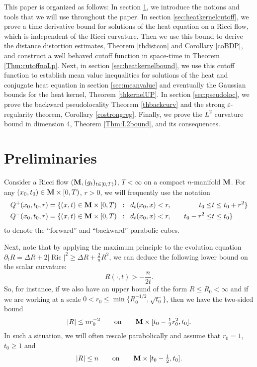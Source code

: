\documentclass[11pt]{amsart}
\numberwithin{equation}{section}
\def\M{{\bf M}}
\DeclareMathOperator{\Ric}{Ric}
\numberwithin{equation}{section}
\begin{document}
This paper is organized as follows:
In section \ref{sec:Preliminaries}, we introduce the notions and tools that we will use throughout the paper.
In section \ref{sec:heatkernelcutoff}, we prove a time derivative bound for solutions of the heat equation on a Ricci flow, which is independent of the Ricci curvature.
Then we use this bound to derive the distance distortion estimates, Theorem \ref{thdistcon} and Corollary \ref{coBDP}, and construct a well behaved cutoff function in space-time in Theorem \ref{Thm:cutoffnoLp}.
Next, in section \ref{sec:heatkernelbound}, we use this cutoff function to establish mean value inequalities for solutions of the heat and conjugate heat equation in section \ref{sec:meanvalue} and eventually the Gaussian bounds for the heat kernel, Theorem \ref{thkernelUP}.
In section \ref{sec:pseudoloc}, we prove the backward pseudolocality Theorem \ref{thbackcurv} and the strong $\varepsilon$-regularity theorem, Corollary \ref{costrongreg}.
Finally, we prove the $L^2$ curvature bound in dimension 4, Theorem \ref{Thm:L2bound}, and its consequences.

\section{Preliminaries} \label{sec:Preliminaries}
Consider a Ricci flow $(\M, (g_t)_{t \in [0,T)})$, $T < \infty$ on a compact $n$-manifold $\M$.
For any $(x_0, t_0) \in \M \times [0,T)$, $r > 0$, we will frequently use the notation
\begin{alignat*}{3}
 Q^+(x_0, t_0, r) &= \{ (x, t) \in \M \times [0,T) \;\; : \;\; d_t (x_0, x)<r, \quad & t_0 \leq & t \leq t_0+r^2 \} \\
 Q^-(x_0, t_0, r) &= \{ (x, t) \in \M \times [0,T) \;\; : \;\; d_t (x_0, x)<r, \quad & t_0 - r^2 \leq & t \leq t_0 \} 
\end{alignat*}
to denote the ``forward'' and ``backward'' parabolic cubes.

Next, note that by applying the maximum principle to the evolution equation $\partial_t R = \Delta R + 2 |{\Ric}|^2 \geq \Delta R + \frac2{n} R^2$, we can deduce the following lower bound on the scalar curvature:
\[ R(\cdot, t) > - \frac{n}{2t}. \]
So, for instance, if we also have an upper bound of the form $R \leq R_0 < \infty$ and if we are working at a scale $0 < r_0 \leq \min \{ R_0^{-1/2}, \sqrt{t_0} \}$, then  we have the two-sided bound
\[ |R| \leq n r_0^{-2} \qquad \text{on} \qquad \M \times [t_0 - \tfrac12 r_0^2, t_0]. \]
In such a situation, we will often rescale parabolically and assume that $r_0 = 1$, $t_0 \geq 1$ and
\[ |R| \leq n \qquad \text{on} \qquad \M \times [t_0 - \tfrac12, t_0]. \]
\end{document}
